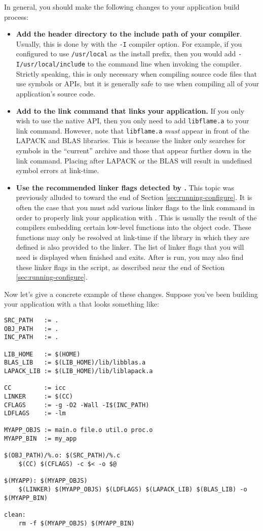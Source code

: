 In general, you should make the following changes to your application build
process:
\begin{itemize}
\item
{\bf Add the \libflame header directory to the include path of your compiler}.
Usually, this is done by with the {\tt -I} compiler option.
For example, if you configured \libflame to use {\tt /usr/local} as the
install prefix, then you would add {\tt -I/usr/local/include} to the command
line when invoking the compiler.
Strictly speaking, this is only necessary when compiling source code files
that use \libflame symbols or APIs, but it is generally safe to use when compiling
all of your application's source code.
\item
{\bf Add \libflame to the link command that links your application.}
If you only wish to use the native \libflame API, then you only need to add
{\tt libflame.a} to your link command.
However, note that {\tt libflame.a} {\em must} appear in front of the
LAPACK and BLAS libraries.
This is because the linker only searches for symbols in the ``current''
archive and those that appear further down in the link command.
Placing \libflame after LAPACK or the BLAS will result in undefined symbol
errors at link-time.
\item
{\bf Use the recommended linker flags detected by \configurens.}
This topic was previously alluded to toward the end of Section
\ref{sec:running-configure}.
It is often the case that you must add various linker flags to the link
command in order to properly link your application with \libflamens.
This is usually the result of the compilers embedding certain low-level
functions into the object code.
These functions may only be resolved at link-time if the library in which
they are defined is also provided to the linker.
The list of linker flags that you will need is displayed when \configure
finished and exits.
After \configure is run, you may also find these linker flags in the
\postconfigure script, as described near the end of
Section \ref{sec:running-configure}.
\end{itemize}

Now let's give a concrete example of these changes.
Suppose you've been building your application with a \makefile that looks
something like:

\begin{Verbatim}[frame=single,framesep=2.5mm,xleftmargin=5mm,commandchars=\#\{\},fontsize=\footnotesize]
SRC_PATH   := .
OBJ_PATH   := .
INC_PATH   := .

LIB_HOME   := $(HOME)
BLAS_LIB   := $(LIB_HOME)/lib/libblas.a
LAPACK_LIB := $(LIB_HOME)/lib/liblapack.a

CC         := icc
LINKER     := $(CC)
CFLAGS     := -g -O2 -Wall -I$(INC_PATH)
LDFLAGS    := -lm 

MYAPP_OBJS := main.o file.o util.o proc.o
MYAPP_BIN  := my_app

$(OBJ_PATH)/%.o: $(SRC_PATH)/%.c
    $(CC) $(CFLAGS) -c $< -o $@

$(MYAPP): $(MYAPP_OBJS)
    $(LINKER) $(MYAPP_OBJS) $(LDFLAGS) $(LAPACK_LIB) $(BLAS_LIB) -o $(MYAPP_BIN)

clean:
    rm -f $(MYAPP_OBJS) $(MYAPP_BIN)
\end{Verbatim}

